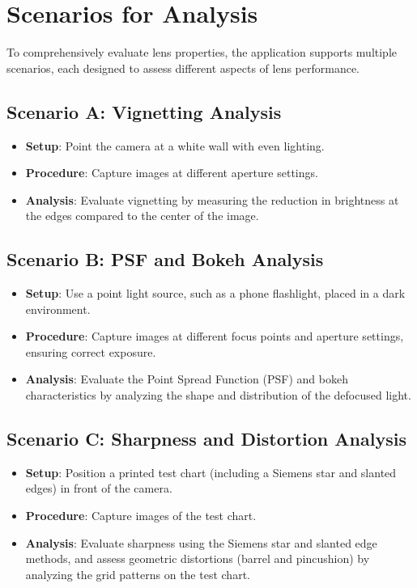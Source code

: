 \section{Scenarios for Analysis}

To comprehensively evaluate lens properties, the application supports multiple scenarios, each designed to assess different aspects of lens performance.

\subsection{Scenario A: Vignetting Analysis}
\begin{itemize}
    \item \textbf{Setup}: Point the camera at a white wall with even lighting.
    \item \textbf{Procedure}: Capture images at different aperture settings.
    \item \textbf{Analysis}: Evaluate vignetting by measuring the reduction in brightness at the edges compared to the center of the image.
\end{itemize}

\subsection{Scenario B: PSF and Bokeh Analysis}
\begin{itemize}
    \item \textbf{Setup}: Use a point light source, such as a phone flashlight, placed in a dark environment.
    \item \textbf{Procedure}: Capture images at different focus points and aperture settings, ensuring correct exposure.
    \item \textbf{Analysis}: Evaluate the Point Spread Function (PSF) and bokeh characteristics by analyzing the shape and distribution of the defocused light.
\end{itemize}

\subsection{Scenario C: Sharpness and Distortion Analysis}
\begin{itemize}
    \item \textbf{Setup}: Position a printed test chart (including a Siemens star and slanted edges) in front of the camera.
    \item \textbf{Procedure}: Capture images of the test chart.
    \item \textbf{Analysis}: Evaluate sharpness using the Siemens star and slanted edge methods, and assess geometric distortions (barrel and pincushion) by analyzing the grid patterns on the test chart.
\end{itemize}

